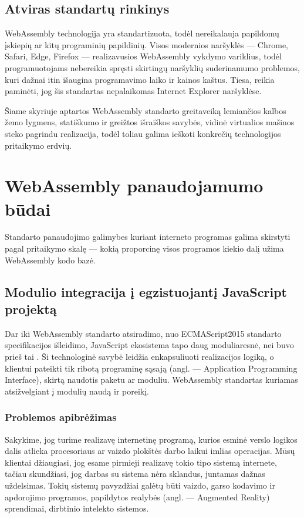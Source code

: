 \documentclass{VUMIFPSkursinis}
\begin{document}
\subsection{Atviras standartų rinkinys}
WebAssembly technologija yra standartizuota, todėl nereikalauja papildomų įskiepių ar kitų programinių papildinių. Visos modernios naršyklės — Chrome, Safari, Edge, Firefox — realizavusios WebAssembly vykdymo variklius, todėl programuotojams nebereikia spręsti skirtingų naršyklių suderinamumo problemos, kuri dažnai itin išaugina programavimo laiko ir kainos kaštus. Tiesa, reikia paminėti, jog šis standartas nepalaikomas Internet Explorer naršyklėse. 

Šiame skyriuje aptartos WebAssembly standarto greitaveiką lemiančios kalbos žemo lygmens, statiškumo ir greižtos išraiškos savybės, vidinė virtualios mašinos steko pagrindu realizacija, todėl toliau galima ieškoti konkrečių technologijos pritaikymo erdvių.

\section{WebAssembly panaudojamumo būdai}
Standarto panaudojimo galimybes kuriant interneto programas galima skirstyti pagal pritaikymo skalę — kokią proporcinę visos programos kiekio dalį užima WebAssembly kodo bazė.

\subsection{Modulio integracija į egzistuojantį JavaScript projektą}
Dar iki WebAssembly standarto atsiradimo, nuo ECMAScript2015 standarto specifikacijos išleidimo, JavaScript ekosistema tapo daug moduliaresnė, nei buvo prieš tai \cite{Cla17}. Ši technologinė savybė leidžia enkapsuliuoti realizacijos logiką, o klientui pateikti tik ribotą programinę sąsają (angl. — Application Programming Interface), skirtą naudotis paketu ar moduliu. WebAssembly standartas kuriamas atsižvelgiant į modulių naudą ir poreikį.

\subsubsection{Problemos apibrėžimas}
Sakykime, jog turime realizavę internetinę programą, kurios esminė verslo logikos dalis atlieka procesoriaus ar vaizdo plokštės darbo laikui imlias operacijas. Mūsų klientai džiaugiasi, jog esame pirmieji realizavę tokio tipo sistemą internete, tačiau skundžiasi, jog darbas su sistema nėra sklandus, juntamas dažnas uždelsimas. Tokių sistemų pavyzdžiai galėtų būti vaizdo, garso kodavimo ir apdorojimo programos, papildytos realybės (angl. — Augmented Reality) sprendimai, dirbtinio intelekto sistemos. 
\end{document}
